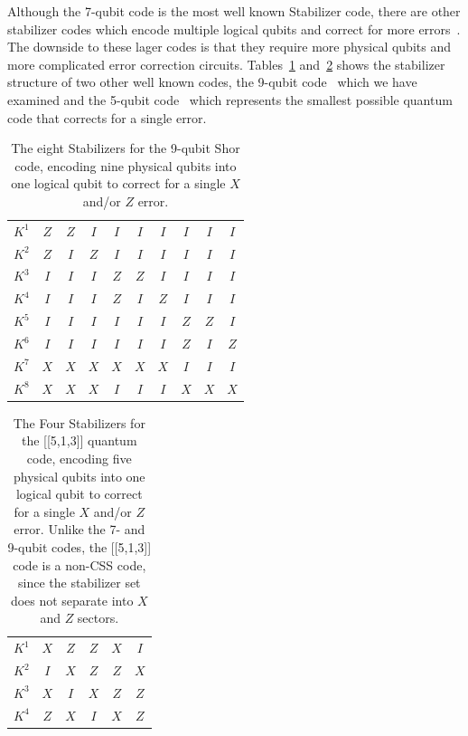 Although the 7-qubit code is the most well known Stabilizer code, there are other stabilizer codes 
which encode multiple logical qubits and correct for more errors~\cite{bib:G97+}.  
The downside to these lager codes is 
that they require more physical qubits and more complicated error correction circuits.  
Tables~\ref{tab:9qubit} 
and~\ref{tab:5qubit} shows the stabilizer structure of two other well known codes, the 9-qubit 
code~\cite{bib:S95} which we have examined and the 5-qubit code~\cite{bib:LMPZ96} which 
represents the smallest possible quantum code that corrects for a single error.  
\begin{table}[ht]
\begin{center}
\vspace*{4pt}   
\begin{tabular}{c|c|c|c|c|c|c|c|c|c}
$K^1$ & $Z$&$Z$&$I$&$I$&$I$&$I$&$I$&$I$&$I$ \\
$K^2$ & $Z$&$I$&$Z$&$I$&$I$&$I$&$I$&$I$&$I$ \\
$K^3$ & $I$&$I$&$I$&$Z$&$Z$&$I$&$I$&$I$&$I$ \\
$K^4$ & $I$&$I$&$I$&$Z$&$I$&$Z$&$I$&$I$&$I$ \\
$K^5$ & $I$&$I$&$I$&$I$&$I$&$I$&$Z$&$Z$&$I$ \\
$K^6$ & $I$&$I$&$I$&$I$&$I$&$I$&$Z$&$I$&$Z$ \\
$K^7$ & $X$&$X$&$X$&$X$&$X$&$X$&$I$&$I$&$I$ \\
$K^8$ & $X$&$X$&$X$&$I$&$I$&$I$&$X$&$X$&$X$ \\
\end{tabular}
\caption{The eight Stabilizers for the 9-qubit Shor code, encoding nine physical qubits into one logical 
qubit to correct for a single $X$ and/or $Z$ error. } 
\label{tab:9qubit}
\end{center}
\end{table} 
\begin{table}[ht]
\begin{center}
\vspace*{4pt}   
\begin{tabular}{c|c|c|c|c|c}
$K^1$ & $X$&$Z$&$Z$&$X$&$I$ \\
$K^2$ & $I$&$X$&$Z$&$Z$&$X$ \\
$K^3$ & $X$&$I$&$X$&$Z$&$Z$ \\
$K^4$ & $Z$&$X$&$I$&$X$&$Z$ \\
\end{tabular}
\caption{The Four Stabilizers for the [[5,1,3]] quantum code, encoding five physical qubits into one logical qubit
to correct for a single $X$ and/or $Z$ error.  Unlike the 7- and 9-qubit codes, the [[5,1,3]] code is a non-CSS 
code, since the stabilizer set does not separate into $X$ and $Z$ sectors.} 
\label{tab:5qubit}
\end{center}
\end{table} 

